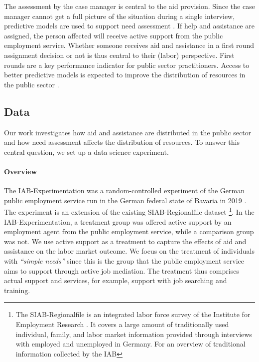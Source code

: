 \documentclass{article} %
\begin{document}
The assessment by the case manager is central to the aid provision. Since the case manager cannot get a full picture of the situation during a single interview, predictive models are used to support need assessment \cite{wirtz2019artificial}. If help and assistance are assigned, the person affected will receive active support from the public employment service. Whether someone receives aid and assistance in a first round assignment decision or not is thus central to their (labor) perspective. First rounds are a key performance indicator for public sector practitioners. Access to better predictive models is expected to improve the distribution of resources in the public sector \cite{blumenstock2016}.

\subsection{Data}
\label{sec:data_data}

Our work investigates how aid and assistance are distributed in the public sector and how need assessment affects the distribution of resources. To answer this central question, we set up a data science experiment.

\paragraph{Overview}
The IAB-Experimentation was a random-controlled experiment of the German public employment service run in the German federal state of Bavaria in 2019 \cite{athey2021policy}. The experiment is an extension of the existing SIAB-Regionalfile dataset \cite{siab2019, siab2019report}\footnote{The SIAB-Regionalfile is an integrated labor force survey of the Institute for Employment Research \cite{siab2019, siab2019report}. It covers a large amount of traditionally used individual, family, and labor market information provided through interviews with employed and unemployed in Germany. For an overview of traditional information collected by the IAB}. In the IAB-Experimentation, a treatment group was offered active support by an employment agent from the public employment service, while a comparison group was not. We use active support as a treatment to capture the effects of aid and assistance on the labor market outcome. We focus on the treatment of individuals with \emph{``simple needs''} since this is the group that the public employment service aims to support through active job mediation. The treatment thus comprises actual support and services, for example, support with job searching and training.
\end{document}
